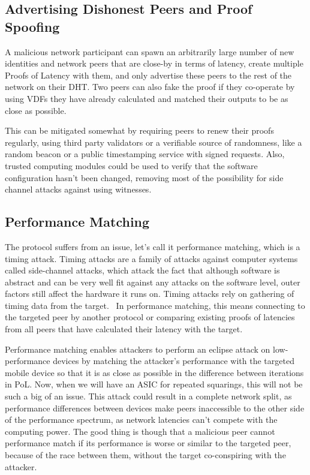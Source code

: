 \subsection{Advertising Dishonest Peers and Proof Spoofing}
A malicious network participant can spawn an arbitrarily large number of new identities and network peers that are close-by in terms of latency, create multiple Proofs of Latency with them, and only advertise these peers to the rest of the network on their DHT. Two peers can also fake the proof if they co-operate by using VDFs they have already calculated and matched their outputs to be as close as possible.

This can be mitigated somewhat by requiring peers to renew their proofs regularly, using third party validators or a verifiable source of randomness, like a random beacon or a public timestamping service with signed requests. Also, trusted computing modules could be used to verify that the software configuration hasn't been changed, removing most of the possibility for side channel attacks against using witnesses.

\subsection{Performance Matching}
The protocol suffers from an issue, let's call it performance matching, which is a timing attack. Timing attacks are a family of attacks against computer systems called side-channel attacks, which attack the fact that although software is abstract and can be very well fit against any attacks on the software level, outer factors still affect the hardware it runs on. Timing attacks rely on gathering of timing data from the target.~\cite{noauthor_undated-mp} In performance matching, this means connecting to the targeted peer by another protocol or comparing existing proofs of latencies from all peers that have calculated their latency with the target.

Performance matching enables attackers to perform an eclipse attack on low-performance devices by matching the attacker's performance with the targeted mobile device so that it is as close as possible in the difference between iterations in PoL. Now, when we will have an ASIC for repeated squarings, this will not be such a big of an issue. This attack could result in a complete network split, as performance differences between devices make peers inaccessible to the other side of the performance spectrum, as network latencies can't compete with the computing power. The good thing is though that a malicious peer cannot performance match if its performance is worse or similar to the targeted peer, because of the race between them, without the target co-conspiring with the attacker.

